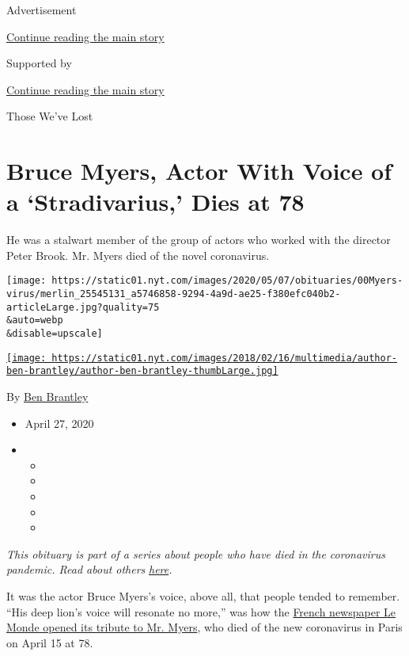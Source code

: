 Advertisement

\protect\hyperlink{after-top}{Continue reading the main story}

Supported by

\protect\hyperlink{after-sponsor}{Continue reading the main story}

Those We've Lost

\hypertarget{bruce-myers-actor-with-voice-of-a-stradivarius-dies-at-78}{%
\section{Bruce Myers, Actor With Voice of a `Stradivarius,' Dies at
78}\label{bruce-myers-actor-with-voice-of-a-stradivarius-dies-at-78}}

He was a stalwart member of the group of actors who worked with the
director Peter Brook. Mr. Myers died of the novel coronavirus.

\texttt{[image: https://static01.nyt.com/images/2020/05/07/obituaries/00Myers-virus/merlin\_25545131\_a5746858-9294-4a9d-ae25-f380efc040b2-articleLarge.jpg?quality=75\\\&auto=webp\\\&disable=upscale]}

\href{https://www.nytimes.com/by/ben-brantley}{\texttt{[image: https://static01.nyt.com/images/2018/02/16/multimedia/author-ben-brantley/author-ben-brantley-thumbLarge.jpg]}}

By \href{https://www.nytimes.com/by/ben-brantley}{Ben Brantley}

\begin{itemize}
\item
  April 27, 2020
\item
  \begin{itemize}
  \item
  \item
  \item
  \item
  \item
  \end{itemize}
\end{itemize}

\emph{This obituary is part of a series about people who have died in
the coronavirus pandemic. Read about others}
\href{https://www.nytimes.com/series/people-who-have-died-of-the-coronavirus}{\emph{here}}\emph{.}

It was the actor Bruce Myers's voice, above all, that people tended to
remember. ``His deep lion's voice will resonate no more,'' was how the
\href{https://www.lemonde.fr/disparitions/article/2020/04/16/la-mort-de-bruce-myers-fidele-compagnon-de-theatre-de-peter-brook_6036824_3382.html}{French
newspaper Le Monde opened its tribute to Mr. Myers}, who died of the new
coronavirus in Paris on April 15 at 78.

